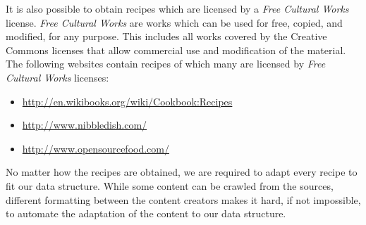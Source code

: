 It is also possible to obtain recipes which are licensed by a \emph{Free Cultural Works}\cite{freedomdefined} license. \emph{Free Cultural Works} are works which can be used for free, copied, and modified, for any purpose. This includes all works covered by the Creative Commons\cite{creativecommons} licenses that allow commercial use and modification of the material. The following websites contain recipes of which many are licensed by \emph{Free Cultural Works} licenses:
\begin{itemize}
	\item \url{http://en.wikibooks.org/wiki/Cookbook:Recipes}
	\item \url{http://www.nibbledish.com/}
	\item \url{http://www.opensourcefood.com/}
\end{itemize}

No matter how the recipes are obtained, we are required to adapt every recipe to fit our data structure. While some content can be crawled from the sources, different formatting between the content creators makes it hard, if not impossible, to automate the adaptation of the content to our data structure.
